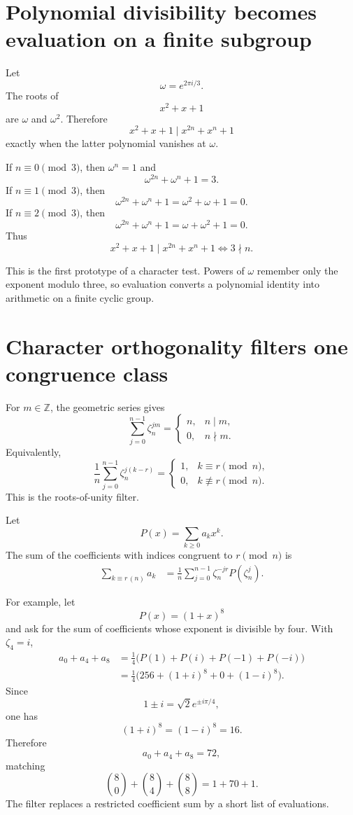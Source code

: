 \section{Polynomial divisibility becomes evaluation on a finite subgroup}

Let
\[
  \omega=e^{2\pi i/3}.
\]
The roots of
\[
  x^2+x+1
\]
are \(\omega\) and \(\omega^2\).  Therefore
\[
  x^2+x+1
  \mid
  x^{2n}+x^n+1
\]
exactly when the latter polynomial vanishes at \(\omega\).

If \(n\equiv0\pmod3\), then \(\omega^n=1\) and
\[
  \omega^{2n}+\omega^n+1=3.
\]
If \(n\equiv1\pmod3\), then
\[
  \omega^{2n}+\omega^n+1
  =\omega^2+\omega+1=0.
\]
If \(n\equiv2\pmod3\), then
\[
  \omega^{2n}+\omega^n+1
  =\omega+\omega^2+1=0.
\]
Thus
\[
  \boxed{
  x^2+x+1\mid x^{2n}+x^n+1
  \iff 3\nmid n.}
\]

This is the first prototype of a character test.  Powers of \(\omega\) remember only the exponent modulo three, so evaluation converts a polynomial identity into arithmetic on a finite cyclic group.

\section{Character orthogonality filters one congruence class}

For \(m\in\mathbb Z\), the geometric series gives
\[
  \sum_{j=0}^{n-1}\zeta_n^{jm}
  =
  \begin{cases}
    n,&n\mid m,\\
    0,&n\nmid m.
  \end{cases}
\]
Equivalently,
\[
  \frac1n
  \sum_{j=0}^{n-1}
  \zeta_n^{j(k-r)}
  =
  \begin{cases}
    1,&k\equiv r\pmod n,\\
    0,&k\not\equiv r\pmod n.
  \end{cases}
\]
This is the roots-of-unity filter.

Let
\[
  P(x)=\sum_{k\ge0}a_kx^k.
\]
The sum of the coefficients with indices congruent to \(r\pmod n\) is
\[
\begin{aligned}
  \sum_{k\equiv r\, (n)}a_k
  &=\frac1n
    \sum_{j=0}^{n-1}
    \zeta_n^{-jr}P(\zeta_n^j).
\end{aligned}
\]

For example, let
\[
  P(x)=(1+x)^8
\]
and ask for the sum of coefficients whose exponent is divisible by four.  With \(\zeta_4=i\),
\[
\begin{aligned}
  a_0+a_4+a_8
  &=\frac14\bigl(P(1)+P(i)+P(-1)+P(-i)\bigr)\\
  &=\frac14\bigl(256+(1+i)^8+0+(1-i)^8\bigr).
\end{aligned}
\]
Since
\[
  1\pm i=\sqrt2e^{\pm i\pi/4},
\]
one has
\[
  (1+i)^8=(1-i)^8=16.
\]
Therefore
\[
  a_0+a_4+a_8=72,
\]
matching
\[
  \binom80+\binom84+\binom88
  =1+70+1.
\]
The filter replaces a restricted coefficient sum by a short list of evaluations.

